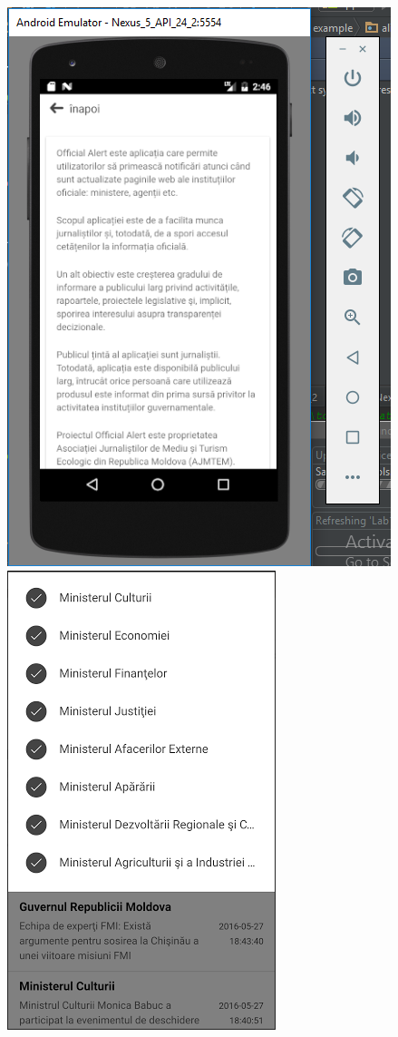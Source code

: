 \documentclass[12pt]{article}
\begin{document}
\includegraphics{2.png}\\
\includegraphics{3.png}\\
\end{document}

